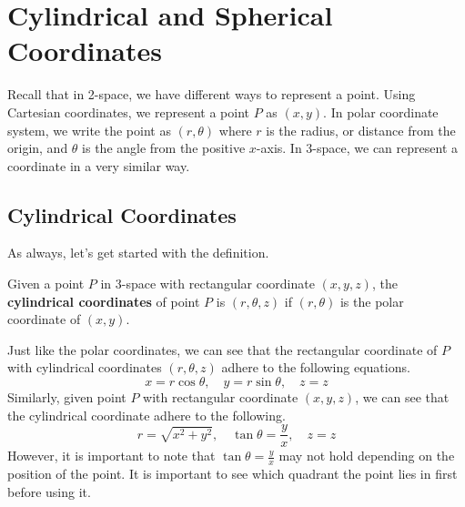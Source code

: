 \documentclass[../../main.tex]{subfiles}
\begin{document}
\section{Cylindrical and Spherical Coordinates}

Recall that in 2-space, we have different ways to represent
a point. Using Cartesian coordinates, we represent a point $P$
as $(x, y)$. In polar coordinate system, we write the point
as $(r, \theta)$ where $r$ is the radius, or distance from the
origin, and $\theta$ is the angle from the positive $x$-axis.
In 3-space, we can represent a coordinate in a very similar way.

\subsection{Cylindrical Coordinates}

As always, let's get started with the definition.

\begin{definition}{}{}
Given a point $P$ in 3-space with rectangular coordinate $(x,y,z)$,
the \textbf{cylindrical coordinates} of point $P$ is $(r, \theta, z)$
if $(r, \theta)$ is the polar coordinate of $(x, y)$.
\end{definition}

Just like the polar coordinates, we can see that the rectangular
coordinate of $P$ with cylindrical coordinates $(r, \theta, z)$
adhere to the following equations.
\[
x = r\cos\theta, \quad
y = r\sin\theta, \quad
z = z
\]
Similarly, given point $P$ with rectangular coordinate $(x,y,z)$,
we can see that the cylindrical coordinate adhere to the following.
\[
r = \sqrt{x^2 + y^2}, \quad
\tan\theta = \frac{y}{x}, \quad
z = z
\]
However, it is important to note that $\tan\theta = \frac{y}{x}$
may not hold depending on the position of the point. It is important
to see which quadrant the point lies in first before using it.
\end{document}

